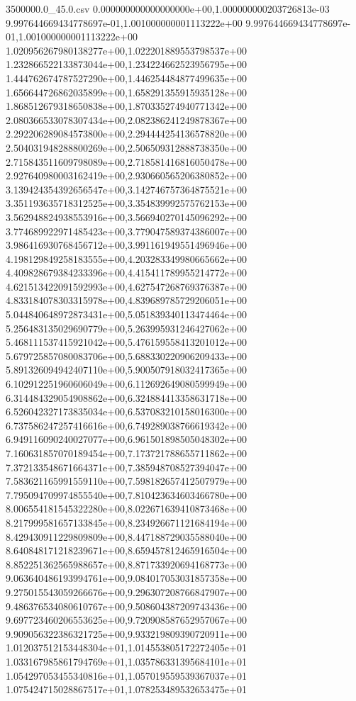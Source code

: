 \begin{filecontents*}{3500000.0_45.0.csv}
0.000000000000000000e+00,1.000000000203726813e-03
9.997644669434778697e-01,1.001000000001113222e+00
9.997644669434778697e-01,1.001000000001113222e+00
1.020956267980138277e+00,1.022201889553798537e+00
1.232866522133873044e+00,1.234224662523956795e+00
1.444762674787527290e+00,1.446254484877499635e+00
1.656644726862035899e+00,1.658291355915935128e+00
1.868512679318650838e+00,1.870335274940771342e+00
2.080366533078307434e+00,2.082386241249878367e+00
2.292206289084573800e+00,2.294444254136578820e+00
2.504031948288800269e+00,2.506509312888738350e+00
2.715843511609798089e+00,2.718581416816050478e+00
2.927640980003162419e+00,2.930660565206380852e+00
3.139424354392656547e+00,3.142746757364875521e+00
3.351193635718312525e+00,3.354839992575762153e+00
3.562948824938553916e+00,3.566940270145096292e+00
3.774689922971485423e+00,3.779047589374386007e+00
3.986416930768456712e+00,3.991161949551496946e+00
4.198129849258183555e+00,4.203283349980665662e+00
4.409828679384233396e+00,4.415411789955214772e+00
4.621513422091592993e+00,4.627547268769376387e+00
4.833184078303315978e+00,4.839689785729206051e+00
5.044840648972873431e+00,5.051839340113474464e+00
5.256483135029690779e+00,5.263995931246427062e+00
5.468111537415921042e+00,5.476159558413201012e+00
5.679725857080083706e+00,5.688330220906209433e+00
5.891326094942407110e+00,5.900507918032417365e+00
6.102912251960606049e+00,6.112692649080599949e+00
6.314484329054908862e+00,6.324884413358631718e+00
6.526042327173835034e+00,6.537083210158016300e+00
6.737586247257416616e+00,6.749289038766619342e+00
6.949116090240027077e+00,6.961501898505048302e+00
7.160631857070189454e+00,7.173721788655711862e+00
7.372133548671664371e+00,7.385948708527394047e+00
7.583621165991559110e+00,7.598182657412507979e+00
7.795094709974855540e+00,7.810423634603466780e+00
8.006554181545322280e+00,8.022671639410873468e+00
8.217999581657133845e+00,8.234926671121684194e+00
8.429430911229809809e+00,8.447188729035588040e+00
8.640848171218239671e+00,8.659457812465916504e+00
8.852251362565988657e+00,8.871733920694168773e+00
9.063640486193994761e+00,9.084017053031857358e+00
9.275015543059266676e+00,9.296307208766847907e+00
9.486376534080610767e+00,9.508604387209743436e+00
9.697723460206553625e+00,9.720908587652957067e+00
9.909056322386321725e+00,9.933219809390720911e+00
1.012037512153448304e+01,1.014553805172272405e+01
1.033167985861794769e+01,1.035786331395684101e+01
1.054297053455340816e+01,1.057019559539367037e+01
1.075424715028867517e+01,1.078253489532653475e+01

\end{filecontents*}
